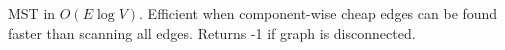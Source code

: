 
MST in $O(E \log V)$. Efficient when component-wise cheap edges can be found faster than scanning all edges. Returns -1 if graph is disconnected.


